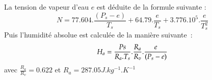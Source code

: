 La tension de vapeur d'eau $e$ est d\'eduite de la
formule suivante :   
\[
N = 77.604.\frac{(P_s-e)}{T_s} + 64.79.\frac{e}{T_s} 
    + 3.776.10^5.\frac{e}{T_s^2}
\]
Puis l'humidit\'e absolue est calcul\'ee de la
mani\`ere suivante~:
\[
H_a = \frac{Ps \time 100}{R_a.T_s}
      .\frac{R_a}{R_v}.\frac{e}{(P_s-e)}
\]
avec $\frac{R_a}{R_v} = 0.622$ et $R_a = 287.05 J.kg^{-1}.K^{-1}$
